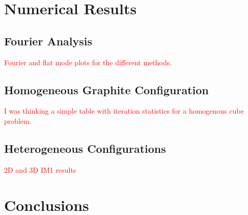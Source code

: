 \documentclass[preprint,10pt]{elsarticle}
\newcommand{\tcr}[1]{\textcolor{red}{#1}}
\begin{document}
\section{Numerical Results} \label{sec::results}

\subsection{Fourier Analysis}
\tcr{Fourier and flat mode plots for the different methods.}

\subsection{Homogeneous Graphite Configuration}
\tcr{I was thinking a simple table with iteration statistics for a homogenous cube problem.}

\subsection{Heterogeneous Configurations}

\tcr{2D and 3D IM1 results}

\section{Conclusions} \label{sec::conclusions}


\end{document}
